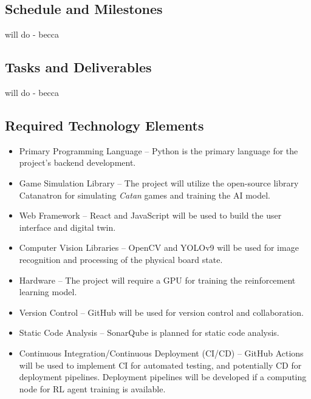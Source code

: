 \documentclass{article}
\begin{document}
\subsection{Schedule and Milestones}\label{subsec:schedule}
\raggedright will do - becca

\subsection{Tasks and Deliverables}\label{subsec:tasks}
\raggedright will do - becca


\subsection{Required Technology Elements}\label{subsec:requiredtech}
\begin{itemize}
    \item {Primary Programming Language} – Python is the primary language for the project's backend development.
    \item {Game Simulation Library} – The project will utilize the open-source library Catanatron for simulating \emph{Catan} games and training the AI model.
    \item {Web Framework} – React and JavaScript will be used to build the user interface and digital twin.
    \item {Computer Vision Libraries} – OpenCV and YOLOv9 will be used for image recognition and processing of the physical board state.
    \item {Hardware} – The project will require a GPU for training the reinforcement learning model.
    \item {Version Control} – GitHub will be used for version control and collaboration.
    \item {Static Code Analysis} – SonarQube is planned for static code analysis.
    \item {Continuous Integration/Continuous Deployment (CI/CD)} – GitHub Actions will be used to implement CI for automated testing, and potentially CD for deployment pipelines. Deployment pipelines will be developed if a computing node for RL agent training is available.
\end{itemize}
\end{document}
